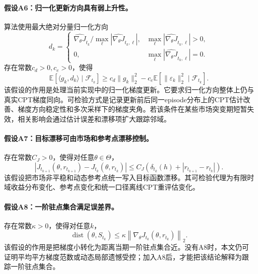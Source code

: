 \paragraph{假设A6：归一化更新方向具有弱上升性。}
算法使用最大绝对分量归一化方向
\begin{equation}
\label{eq:normalized_direction}
d_k
=
\begin{cases}
\widehat{\nabla_\theta J}_{t_k}/\max_\ell|\widehat{\nabla_\theta J}_{t_k,\ell}|, &
\max_\ell|\widehat{\nabla_\theta J}_{t_k,\ell}|>0,\\[4pt]
0, & \max_\ell|\widehat{\nabla_\theta J}_{t_k,\ell}|=0.
\end{cases}
\end{equation}
存在常数$c_d>0,c_e>0$，使得
\begin{equation}
\label{eq:ascent_alignment}
\mathbb{E}
\left[
\langle g_k,d_k\rangle
\mid \mathcal{F}_{t_k}
\right]
\ge
c_d\|g_k\|_2^2
-
c_e\mathbb{E}
\left[
\|\varepsilon_k\|_2^2
\mid \mathcal{F}_{t_k}
\right].
\end{equation}
该假设的作用是处理当前实现中的归一化梯度更新。它要求归一化方向整体上仍与真实CPT梯度同向。可检验方式是记录更新前后同一episode分布上的CPT估计改善、梯度方向稳定性和多次采样下的梯度夹角。若该条件在某些市场突变期短暂失效，相关影响会通过估计误差和漂移项扩大跟踪邻域。

\paragraph{假设A7：目标漂移可由市场和参考点漂移控制。}
存在常数$C_J>0$，使得对任意$\theta\in\Theta$，
\begin{equation}
\label{eq:target_drift}
\left|
J_{t_{k+1}}(\theta,r_{t_{k+1}})
-
J_{t_k}(\theta,r_{t_k})
\right|
\le
C_J
\left(
\delta_{t_k}(h)+|r_{t_{k+1}}-r_{t_k}|
\right).
\end{equation}
该假设把市场非平稳和动态参考点统一写入目标函数漂移。其可检验代理为有限时域收益分布变化、参考点变化和统一口径离线CPT重评估变化。

\paragraph{假设A8：一阶驻点集合满足误差界。}
存在常数$\kappa>0$，使得对任意$k$，
\begin{equation}
\label{eq:error_bound}
\operatorname{dist}(\theta,S_{t_k})
\le
\kappa
\left\|
\nabla_\theta J_{t_k}(\theta,r_{t_k})
\right\|_2.
\end{equation}
该假设的作用是把梯度小转化为距离当期一阶驻点集合近。没有A8时，本文仍可证明平均平方梯度范数或动态局部遗憾受控；加入A8后，才能把该结论解释为跟踪一阶驻点集合。

